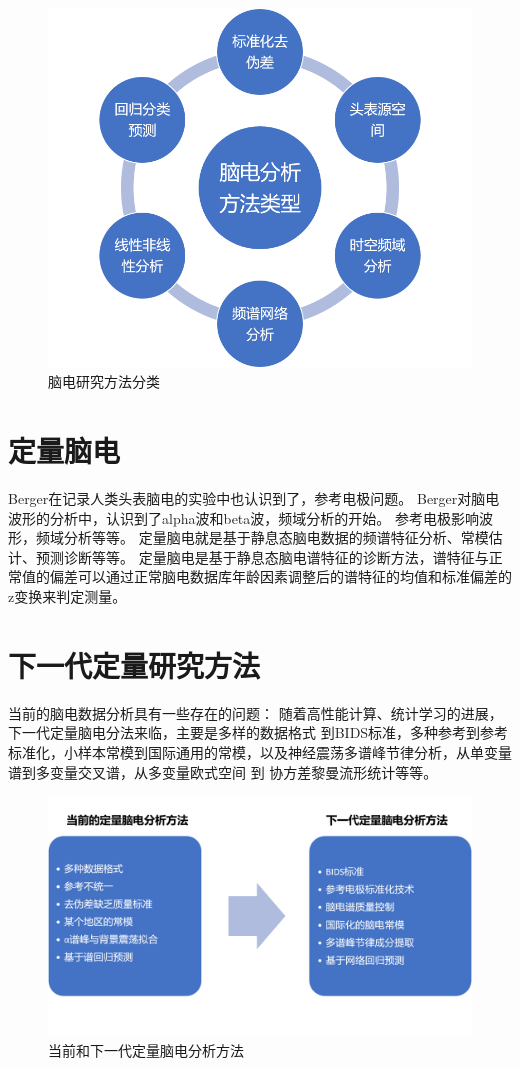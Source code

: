 \begin{figure}
	\includegraphics[width=15cm]{pic/xulun/figure2.png}
	\caption{脑电研究方法分类}
\end{figure}

\section{定量脑电}
Berger在记录人类头表脑电的实验中也认识到了，参考电极问题。 Berger对脑电波形的分析中，认识到了alpha波和beta波，频域分析的开始。
参考电极影响波形，频域分析等等。 定量脑电就是基于静息态脑电数据的频谱特征分析、常模估计、预测诊断等等。
定量脑电是基于静息态脑电谱特征的诊断方法，谱特征与正常值的偏差可以通过正常脑电数据库年龄因素调整后的谱特征的均值和标准偏差的z变换来判定测量。

\section{下一代定量研究方法}
当前的脑电数据分析具有一些存在的问题：
随着高性能计算、统计学习的进展，下一代定量脑电分法来临，主要是多样的数据格式 到BIDS标准，多种参考到参考标准化，小样本常模到国际通用的常模，以及神经震荡多谱峰节律分析，从单变量谱到多变量交叉谱，从多变量欧式空间 到 协方差黎曼流形统计等等。
\begin{figure}
	\includegraphics[width=15cm]{pic/xulun/figure3.png}
	\caption{当前和下一代定量脑电分析方法}
\end{figure}
